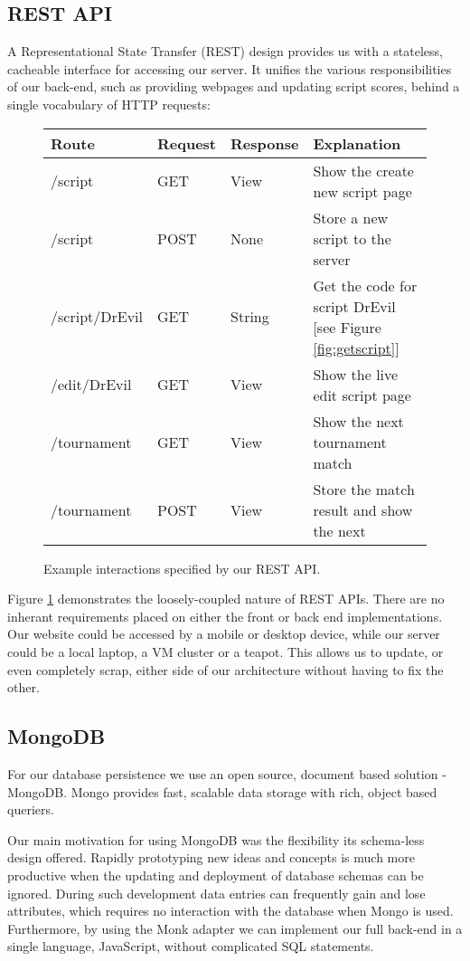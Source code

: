 \subsection{REST API}
A Representational State Transfer (REST) design provides us with a stateless, cacheable interface for accessing our server. It unifies the various responsibilities of our back-end, such as providing webpages and updating script scores, behind a single vocabulary of HTTP requests:
\begin{figure}[H]
\centering
\begin{tabular}{| l | l | l | l |}\hline
Route & Request &  Response & Explanation\\\hline\hline
/script & GET & View & Show the create new script page\\\hline
/script & POST & None & Store a new script to the server\\\hline
/script/DrEvil & GET & String & Get the code for script DrEvil [see Figure \ref{fig:getscript}]\\\hline
/edit/DrEvil & GET & View & Show the live edit script page\\\hline
/tournament & GET & View & Show the next tournament match\\\hline
/tournament & POST & View & Store the match result and show the next \\\hline
\end{tabular}
\caption{Example interactions specified by our REST API.}
\label{fig:api}
\end{figure}

Figure \ref{fig:api} demonstrates the loosely-coupled nature of REST APIs. There are no inherant requirements placed on either the front or back end implementations. Our website could be accessed by a mobile or desktop device, while our server could be a local laptop, a VM cluster or a teapot\cite{rfc}. This allows us to update, or even completely scrap, either side of our architecture without having to fix the other.

\subsection{MongoDB}
For our database persistence we use an open source, document based solution - MongoDB\cite{mongo}. Mongo provides fast, scalable data storage with rich, object based queriers.

Our main motivation for using MongoDB was the flexibility its schema-less design offered\cite{whymongo}. Rapidly prototyping new ideas and concepts is much more productive when the updating and deployment of database schemas can be ignored. During such development data entries can frequently gain and lose attributes, which requires no interaction with the database when Mongo is used. Furthermore, by using the Monk adapter we can implement our full back-end in a single language, JavaScript, without complicated SQL statements.

